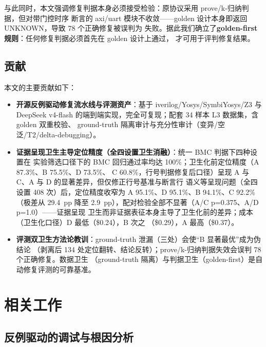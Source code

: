 \documentclass[twocolumn,10pt]{ctexart}
\begin{document}
与此同时，本文强调修复判据本身必须接受检验：原协议采用 prove/k-归纳判据，但对带门控时序
断言的 axi/uart 模块不收敛——golden 设计本身即返回 UNKNOWN，导致 78 个正确修复被误判为
失败。据此我们确立了\textbf{golden-first 规则}：任何修复判据必须首先在 golden 设计上通过，
才可用于评判修复结果。

\subsection*{贡献}

本文的主要贡献如下：

\begin{itemize}
\item \textbf{开源反例驱动修复流水线与评测资产}：基于 iverilog/Yosys/SymbiYosys/Z3 与
DeepSeek v4-flash 的端到端实现，完全可复现；配套 34 样本 L3 数据集，含 golden 双重校验、
ground-truth 隔离审计与充分性审计（变异/空泛/T2/delta-debugging）。
\item \textbf{证据呈现卫生主导定位精度（全四设置卫生消融）}：统一 BMC 判据下四种设置在
实验筛选口径下的 BMC 回归通过率均达 100\%；卫生化前定位精度（A 87.3\%、B 75.5\%、D 73.5\%、
C 60.8\%，行号判据修复后口径）呈现 A 与 C、A 与 D 的显著差异，但仅修正行号基准与断言行
语义等呈现问题（全四设置 408 次）后，定位精度收窄为 A 95.1\%、D 95.1\%、B 94.1\%、C 92.2\%
（极差从 29.4~pp 降至 2.9~pp），配对检验全部不显著（A/C p=0.375、A/D p=1.0）——证据呈现
卫生而非证据表征本身主导了卫生化前的差异；成本（卫生化口径）D 最低（\$0.24），B 次之
（\$0.29），A 最高（\$0.37）。
\item \textbf{评测双卫生方法论教训}：ground-truth 泄漏（三处）会使“B 显著最优”成为伪结论
（剥离后 134 处定位翻转、结论反转）；prove/k-归纳判据失效会误判 78 个正确修复。数据卫生
（ground-truth 隔离）与判据卫生（golden-first）是自动修复评测的可靠基准。
\end{itemize}

\section{相关工作}

\subsection{反例驱动的调试与根因分析}
\end{document}
